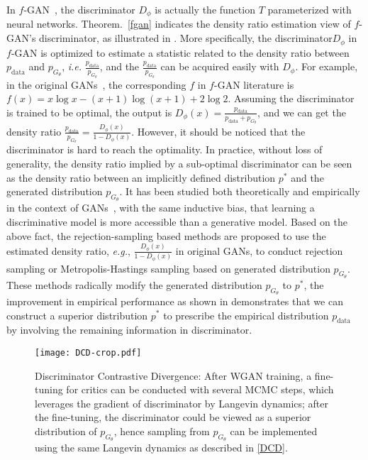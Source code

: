 \documentclass{article}
\begin{document}
In $f$-GAN~\cite{nowozin2016f}, the discriminator $D_\phi$ is actually the function $T$ parameterized with neural networks. Theorem.~\ref{fgan} indicates the density ratio estimation view of $f$-GAN's discriminator, as illustrated in \cite{uehara2016generative}. More specifically, the discriminator$D_\phi$ in $f$-GAN is  optimized to estimate a statistic related to the density ratio between $p_{\text{data}}$ and $p_{G_\theta}$, \emph{i.e.} $\frac{p_{\text{data}}}{p_{G_\theta}}$, and the  $\frac{p_{\text{data}}}{p_{G_\theta}}$ can be acquired easily with $D_\phi$. For example, in the original GANs~\cite{goodfellow2014generative}, the corresponding $f$ in $f$-GAN literature is $f(x) = x\log x - (x+1)\log(x+1) + 2\log2 $. Assuming the discriminator is trained to be optimal, the output is $D_\phi(x) = \frac{p_{\text{data}}}{p_{\text{data}}+p_{G_\theta}}$, and we can get the density ratio $\frac{p_{\text{data}}}{p_{G_\theta}} = \frac{D_\phi(x)}{1-D_\phi(x)}$. However, it should be noticed that the discriminator is hard to reach the optimality. In practice, without loss of generality, the density ratio implied by a sub-optimal discriminator can be seen as the density ratio between an  implicitly defined distribution $p^{*}$ and the generated distribution $p_{G_\theta}$. It has been studied both theoretically and empirically in the context of GANs~\cite{arjovsky2017wasserstein,heusel2017gans,hjelm2017boundary}, with the same inductive bias, that learning a discriminative model is more accessible than a generative model. Based on the above fact, the rejection-sampling based methods are proposed to use the estimated density ratio, \emph{e.g.}, $\frac{D_\phi(x)}{1-D_\phi(x)}$ in original GANs, to conduct rejection sampling\cite{azadi2018discriminator} or Metropolis-Hastings sampling\cite{turner2018metropolis} based on generated distribution $p_{G_\theta}$. These methods radically modify the generated distribution $p_{G_\theta}$ to $p^{*}$, the improvement in empirical performance as shown in \cite{azadi2018discriminator,turner2018metropolis} demonstrates that we can construct a superior distribution  $p^{*}$  to prescribe the empirical distribution $p_{\text{data}}$ by involving the remaining information in discriminator. 

\begin{figure*}[!t]\label{fig::overview}
	\centering
    \texttt{[image: DCD-crop.pdf]} 
    \caption{\label{fig:dcd} Discriminator Contrastive Divergence: 
    After WGAN training, a fine-tuning for critics can be conducted with several MCMC steps, which leverages the gradient of discriminator by Langevin dynamics;
    after the fine-tuning, the discriminator could be viewed as a superior distribution of $p_{G_\theta}$, hence sampling from $p_{G_\theta}$ can be implemented using the same Langevin dynamics as described in \ref{DCD}.
    }
    \vspace{-5pt}
\end{figure*}
\end{document}
